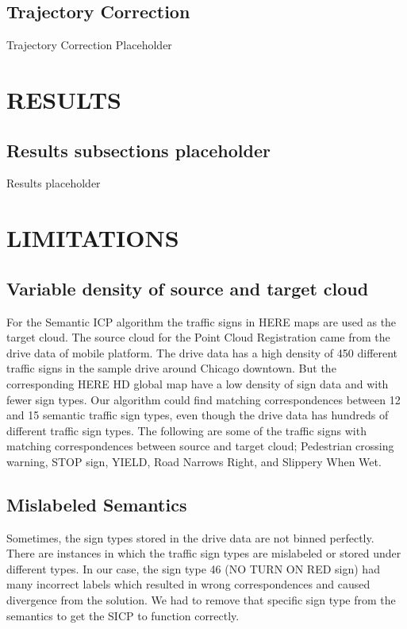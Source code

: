 \documentclass[letterpaper, 10 pt, conference]{ieeeconf}  %
\begin{document}
\subsection{Trajectory Correction}

Trajectory Correction Placeholder


\section{RESULTS}


\subsection{Results subsections placeholder} 


Results placeholder


\section{LIMITATIONS}

\subsection{Variable density of source and target cloud}


For the Semantic ICP algorithm the traffic signs in HERE maps are used as the target cloud. The source cloud for the Point Cloud Registration came from the drive data of mobile platform. The drive data has a high density of 450 different traffic signs in the sample drive around Chicago downtown. But the corresponding HERE HD global map have a low density of sign data and with fewer sign types. Our algorithm could find matching correspondences between 12 and 15 semantic traffic sign types, even though the drive data has hundreds of different traffic sign types. The following are some of the traffic signs with matching correspondences between source and target cloud; Pedestrian crossing warning, STOP sign, YIELD, Road Narrows Right, and Slippery When Wet.
\subsection{Mislabeled Semantics}

Sometimes, the sign types stored in the drive data are not binned perfectly. There are instances in which the traffic sign types are mislabeled or stored under different types. In our case, the sign type 46 (NO TURN ON RED sign) had many incorrect labels which resulted in wrong correspondences and caused divergence from the solution. We had to remove that specific sign type from the semantics to get the SICP to function correctly.
\end{document}
